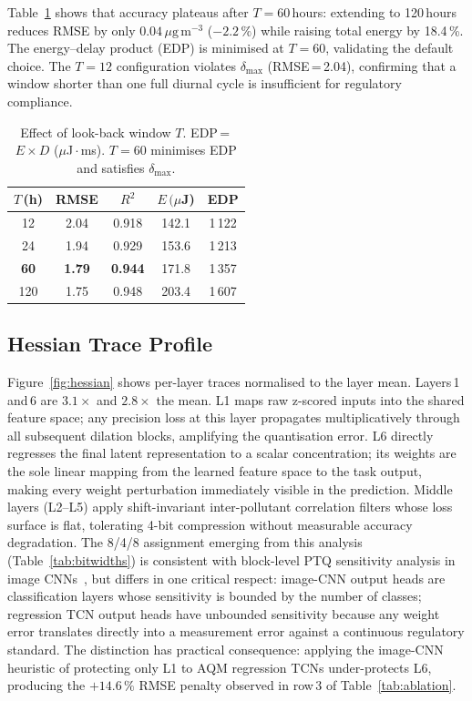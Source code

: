\documentclass[12pt,a4paper]{article}
\begin{document}
Table~\ref{tab:window} shows that accuracy plateaus after $T=60$\,hours:
extending to 120\,hours reduces RMSE by only $0.04\,\mu\mathrm{g\,m^{-3}}$
($-2.2\,\%$) while raising total energy by 18.4\,\%.
The energy--delay product (EDP) is minimised at $T=60$, validating
the default choice.
The $T=12$ configuration violates $\delta_\mathrm{max}$
(RMSE\,=\,2.04), confirming that a window shorter than one full
diurnal cycle is insufficient for regulatory compliance.

\begin{table}[ht]
\centering
\caption{Effect of look-back window $T$.
EDP\,=\,$E\!\times\!D$ ($\mu$J\,$\cdot$\,ms).
$T=60$ minimises EDP and satisfies $\delta_\mathrm{max}$.}
\label{tab:window}
\setlength{\tabcolsep}{5.5pt}
\begin{tabular}{@{}ccccc@{}}
\toprule
$T$\,(h) & RMSE & $R^2$ & $E\,(\mu$J) & EDP \\
\midrule
 12          & 2.04          & 0.918 & 142.1 & 1\,122 \\
 24          & 1.94          & 0.929 & 153.6 & 1\,213 \\
\textbf{60}  & \textbf{1.79} & \textbf{0.944} & 171.8 & 1\,357 \\
120          & 1.75          & 0.948 & 203.4 & 1\,607 \\
\bottomrule
\end{tabular}
\end{table}

\subsection{Hessian Trace Profile}
\label{sec:sens_hessian}

Figure~\ref{fig:hessian} shows per-layer traces normalised to the
layer mean.
Layers\,1 and\,6 are $3.1\times$ and $2.8\times$ the mean.
L1 maps raw z-scored inputs into the shared feature space; any
precision loss at this layer propagates multiplicatively through all
subsequent dilation blocks, amplifying the quantisation error.
L6 directly regresses the final latent representation to a scalar
concentration; its weights are the sole linear mapping from the
learned feature space to the task output, making every weight
perturbation immediately visible in the  prediction.
Middle layers (L2--L5) apply shift-invariant inter-pollutant
correlation filters whose loss surface is flat, tolerating 4-bit
compression without measurable accuracy degradation.
The 8/4/8 assignment emerging from this analysis (Table~\ref{tab:bitwidths})
is consistent with block-level PTQ sensitivity analysis in
image CNNs~\cite{li2021brecq,dong2021hawqv3}, but differs in one
critical respect: image-CNN output heads are classification layers
whose sensitivity is bounded by the number of classes; regression
TCN output heads have unbounded sensitivity because any weight error
translates directly into a measurement error against a continuous
regulatory standard.
The distinction has practical consequence: applying the image-CNN
heuristic of protecting only L1 to AQM regression TCNs
under-protects L6, producing the $+14.6\,\%$ RMSE penalty observed
in row\,3 of Table~\ref{tab:ablation}.
\end{document}
